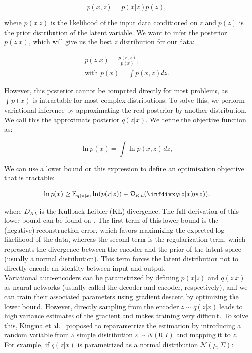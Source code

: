 \begin{equation}
    p(x,z) = p(x|z)p(z),
\end{equation}

where $p(x|z)$ is the likelihood of the input data conditioned on $z$ and $p(z)$ is the prior distribution of the latent variable. We want to infer the posterior $p(z|x)$, which will give us the best $z$ distribution for our data:

\begin{equation} \label{eq:rnnvae:intract}
\begin{aligned}
p(z|x) = \frac{p(x,z)}{p(x)}, \\
\text{with } p(x) = \int p(x,z) dz.
\end{aligned}
\end{equation}

However, this posterior cannot be computed directly for most problems, as $\int p(x)$ is intractable for most complex distributions. To solve this, we perform variational inference by approximating the real posterior by another distribution. We call this the approximate posterior $q(z|x)$. We define the objective function as:

\begin{equation}
\ln p(x) = \int \ln p(x,z) \,dz,
\end{equation}

We can use a lower bound on this expression to define an optimization objective that is tractable: 

\begin{equation}
    \ln p(x) \geq \mathbb{E}_{q(z|x)} \ln(p(x|z)) - \mathcal{D}_{KL}(\infdiv{q(z|x)}{p(z)}),
\end{equation}

where $D_{KL}$ is the Kullback-Leibler (KL) divergence. The full derivation of this lower bound can be found on \cite{Kingma2014}. The first term of this lower bound is the (negative) reconstruction error, which favors maximizing the expected log likelihood of the data, whereas the second term is the regularization term, which represents the divergence between the encoder and the prior of the latent space (usually a normal distribution). This term forces the latent distribution not to directly encode an identity between input and output. \\

Variational auto-encoders can be parametrized by defining $p(x|z)$ and $q(z|x)$ as neural networks (usually called the decoder and encoder, respectively), and we can train their associated parameters using gradient descent by optimizing the lower bound. However, directly sampling from the encoder $z\sim q(z|x)$ leads to high variance estimates of the gradient and makes training very difficult. To solve this, Kingma et al.\ \cite{Kingma2015} proposed to reparametrize the estimation by introducing a random variable from a simple distribution $\varepsilon \sim N(0,I)$ and mapping it to $z$. For example, if $q(z|x)$ is parametrized as a normal distribution $\mathcal{N}(\mu, \Sigma)$:

